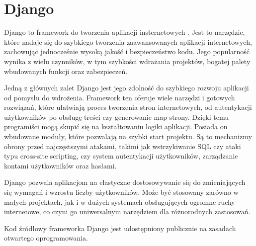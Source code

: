 \section{Django}

Django to framework do tworzenia aplikacji insternetowych \cite{djangooverview}.
Jest to narzędzie, które nadaje się do szybkiego tworzenia zaawansowanych aplikacji internetowych, zachowując jednocześnie wysoką jakość i bezpieczeństwo kodu.
Jego popularność wynika z wielu czynników, w tym szybkości wdrażania projektów, bogatej palety wbudowanych funkcji oraz zabezpieczeń.

Jedną z głównych zalet Django jest jego zdolność do szybkiego rozwoju aplikacji od pomysłu do wdrożenia.
Framework ten oferuje wiele narzędzi i gotowych rozwiązań, które ułatwiają proces tworzenia stron internetowych, od autentykacji użytkowników po obsługę treści czy generowanie map strony.
Dzięki temu programiści mogą skupić się na kształtowaniu logiki aplikacji.
Posiada on wbudowane moduły, które pozwalają na szybki start projektu.
Są to mechanizmy obrony przed najczęstszymi atakami, takimi jak wstrzykiwanie SQL czy ataki typu cross-site scripting, czy system autentykacji użytkowników, zarządzanie kontami użytkowników oraz hasłami.

Django pozwala aplikacjom na elastyczne dostosowywanie się do zmieniających się wymagań i wzrostu liczby użytkowników.
Może być stosowany zarówno w małych projektach, jak i w dużych systemach obsługujących ogromne ruchy internetowe, co czyni go uniwersalnym narzędziem dla różnorodnych zastosowań.

Kod źródłowy frameworka Django jest udostępniony publicznie na zasadach otwartego oprogramowania.
